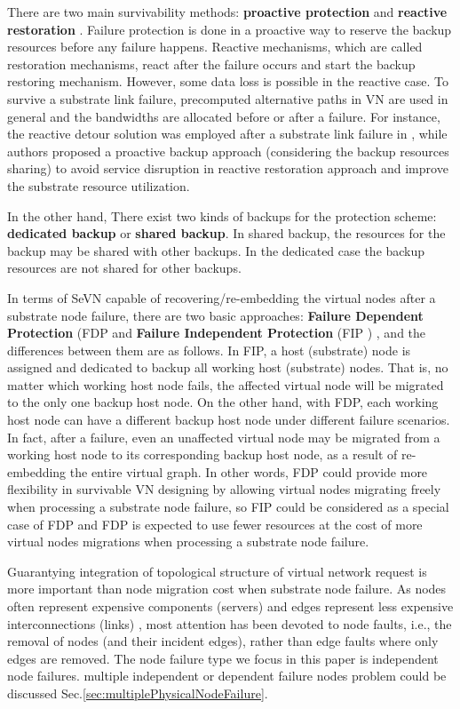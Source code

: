 There are two main survivability methods: \textbf{proactive protection} and \textbf{reactive restoration} \cite{ramamurthy2003survivable}. Failure protection is done in a proactive way to reserve the backup resources before any failure happens. Reactive mechanisms, which are called restoration mechanisms, react after the failure occurs and start the backup restoring mechanism. However, some data loss is possible in the reactive case. To survive a substrate link failure, precomputed alternative paths in VN are used in general and the bandwidths are allocated before or after a failure. For instance, the reactive detour solution was employed after a substrate link failure in \cite{rahman2010survivable}, while authors\cite{rahman2013svne,guo2011shared} proposed a proactive backup approach (considering the backup resources sharing) to avoid service disruption in reactive restoration approach and improve the substrate resource utilization.

In the other hand, There exist two kinds of backups for the protection scheme: \textbf{dedicated backup} or \textbf{shared backup}. In shared backup, the resources for the backup may be shared with other backups. In the dedicated case the backup resources are not shared for other backups.


In terms of SeVN capable of recovering/re-embedding the virtual nodes after a substrate node failure, there are two basic approaches: \textbf{Failure Dependent Protection} (FDP \cite{yu2010survivable} and \textbf{Failure Independent Protection} (FIP \cite{yeow2011designing}) , and the differences between them are as follows. In FIP, a host (substrate) node is assigned and dedicated to backup all working host (substrate) nodes. That is, no matter which working host node fails, the affected virtual node will be migrated to the only one backup host node. On the other hand, with FDP, each working host node can have a different backup host node under different failure scenarios. In fact, after a failure, even an unaffected virtual node may be migrated from a working host node to its corresponding backup host node, as a result of re-embedding the entire virtual graph. In other words, FDP could provide more flexibility in survivable VN designing by allowing virtual nodes migrating freely when processing a substrate node failure, so FIP could be considered as a special case of FDP and FDP is expected to use fewer resources at the cost of more virtual nodes migrations when processing a substrate node failure.


Guarantying integration of topological structure of virtual network request is more important than node migration cost when substrate node failure. As nodes often represent expensive components (servers) and edges represent less expensive interconnections (links) \cite{armbrust2009above,yu2010survivable}, most attention has been devoted to node faults, i.e., the removal of nodes (and their incident edges), rather than edge faults where only edges are removed. The node failure type we focus in this paper is independent node failures. multiple independent or dependent failure nodes problem could be discussed Sec.\ref{sec:multiplePhysicalNodeFailure}.



